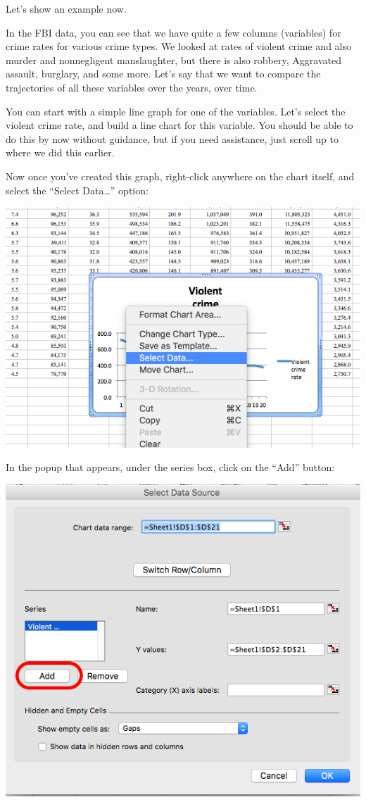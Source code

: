 \documentclass[]{book}
\theoremstyle{definition}
\theoremstyle{definition}
\theoremstyle{definition}
\theoremstyle{remark}
\begin{document}
 Let's show an example now.

In the FBI data, you can see that we have quite a few columns
(variables) for crime rates for various crime types. We looked at rates
of violent crime and also murder and nonnegligent manslaughter, but
there is also robbery, Aggravated assault, burglary, and some more.
Let's say that we want to compare the trajectories of all these
variables over the years, over time.

You can start with a simple line graph for one of the variables. Let's
select the violent crime rate, and build a line chart for this variable.
You should be able to do this by now without guidance, but if you need
assistance, just scroll up to where we did this earlier.

Now once you've created this graph, right-click anywhere on the chart
itself, and select the ``Select Data\ldots{}'' option:

\includegraphics{imgs/comp_c_1.png}

In the popup that appears, under the series box, click on the ``Add''
button:

\includegraphics{imgs/comp_c_2.png}
\end{document}
